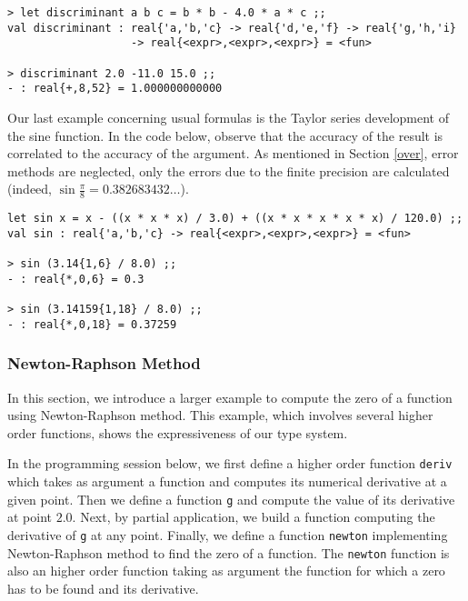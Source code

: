 \begin{verbatim}
> let discriminant a b c = b * b - 4.0 * a * c ;;
val discriminant : real{'a,'b,'c} -> real{'d,'e,'f} -> real{'g,'h,'i} 
                   -> real{<expr>,<expr>,<expr>} = <fun>

> discriminant 2.0 -11.0 15.0 ;;
- : real{+,8,52} = 1.000000000000
\end{verbatim}

Our last example concerning usual formulas is the Taylor series development of the sine function. In the
code below, observe
that the accuracy of the result is correlated to the accuracy of the argument.
As mentioned in Section \ref{over}, error methods are neglected, only the errors due
to the finite precision are calculated (indeed, $\sin \frac{\pi}{8}=0.382683432\ldots$).

\begin{verbatim}
let sin x = x - ((x * x * x) / 3.0) + ((x * x * x * x * x) / 120.0) ;;
val sin : real{'a,'b,'c} -> real{<expr>,<expr>,<expr>} = <fun>

> sin (3.14{1,6} / 8.0) ;;
- : real{*,0,6} = 0.3

> sin (3.14159{1,18} / 8.0) ;;
- : real{*,0,18} = 0.37259
\end{verbatim}


\subsubsection{Newton-Raphson Method}
\label{newton}

In this section, we introduce a larger example to compute the zero of a function    
using Newton-Raphson method. This example, which involves several
higher order functions, shows the expressiveness of our type system.
      
In the programming session below, we first define a higher order function \texttt{deriv}
which takes as argument a function and computes its numerical derivative at a given point.
Then we define a function \texttt{g} and compute the value of its derivative at point $2.0$.
Next, by partial application, we build a function computing the derivative of \texttt{g} at any point.
Finally, we define a function \texttt{newton} implementing Newton-Raphson method to find the
zero of a function. The \texttt{newton} function is also an higher order function taking as
argument the function for which a zero has to be found and its derivative.

